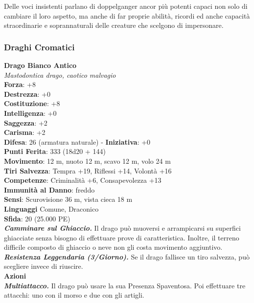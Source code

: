 \begin{multicols}{2}
Delle voci insistenti parlano di doppelganger ancor più potenti capaci non solo di cambiare il loro aspetto, ma anche di far proprie abilità, ricordi ed anche capacità straordinarie e soprannaturali delle creature che scelgono di impersonare.\\


\subsubsection{Draghi Cromatici}

\medskip\textbf{Drago Bianco Antico}\\
\emph{Mastodontica drago, caotico malvagio}\\
\textbf{Forza}: +8\\
\textbf{Destrezza}: +0\\
\textbf{Costituzione}: +8\\
\textbf{Intelligenza}: +0\\
\textbf{Saggezza}: +2\\
\textbf{Carisma}: +2\\
\textbf{Difesa}: 26 (armatura naturale) - \textbf{Iniziativa}: +0\\
\textbf{Punti Ferita}: 333 (18d20 + 144)\\
\textbf{Movimento}: 12 m, nuoto 12 m, scavo 12 m, volo 24 m\\
\textbf{Tiri Salvezza}: Tempra +19, Riflessi +14, Volontà +16\\
\textbf{Competenze}: Criminalità +6, Consapevolezza +13\\
\textbf{Immunità al Danno}: freddo\\
\textbf{Sensi}: Scurovisione 36 m, vista cieca 18 m\\
\textbf{Linguaggi} Comune, Draconico\\
\textbf{Sfida}: 20 (25.000 PE)\smallskip\\
\emph{\textbf{Camminare sul Ghiaccio.}} Il drago può muoversi e arrampicarsi su superfici ghiacciate senza bisogno di effettuare prove di caratteristica. Inoltre, il terreno difficile composto di ghiaccio o neve non gli costa movimento aggiuntivo.\\
\emph{\textbf{Resistenza Leggendaria (3/Giorno).}} Se il drago fallisce un tiro salvezza, può scegliere invece di riuscire.\\
\smallskip\textbf{Azioni}\\
\emph{\textbf{Multiattacco.}} Il drago può usare la sua Presenza Spaventosa. Poi effettuare tre attacchi: uno con il morso e due con gli artigli.\\

\end{multicols}
